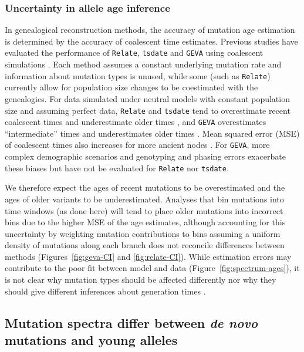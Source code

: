 \documentclass[]{article}
\newcommand{\GEVA}{\texttt{GEVA}\xspace}
\newcommand{\tsdate}{\texttt{tsdate}\xspace}
\newcommand{\relate}{\texttt{Relate}\xspace}
\begin{document}
\subsubsection*{Uncertainty in allele age inference}

In genealogical reconstruction methods, the accuracy of mutation age estimation
is determined by the accuracy of coalescent time estimates. Previous studies
have evaluated the performance of \relate, \tsdate and \GEVA using coalescent
simulations \citep{brandt2022evaluation,albers2020dating}. Each method assumes
a constant underlying mutation rate and information about mutation types is
unused, while some (such as \relate) currently allow for population size
changes to be coestimated with the genealogies. For data simulated under
neutral models with constant population size and assuming perfect data, \relate
and \tsdate tend to overestimate recent coalescent times and underestimate
older times \citep{brandt2022evaluation}, and \GEVA overestimates
``intermediate'' times and underestimates older times \citep{albers2020dating}.
Mean squared error (MSE) of coalescent times also increases for more ancient
nodes \citep{brandt2022evaluation}. For \GEVA, more complex demographic
scenarios and genotyping and phasing errors exacerbate these biases
\cite{albers2020dating} but have not be evaluated for \relate nor \tsdate.

We therefore expect the ages of recent mutations to be overestimated and the
ages of older variants to be underestimated. Analyses that bin mutations into
time windows (as done here) will tend to place older mutations into incorrect
bins due to the higher MSE of the age estimates, although accounting for this
uncertainty by weighting mutation contributions to bins assuming a uniform
density of mutations along each branch does not reconcile differences between
methods (Figures~\ref{fig:geva-CI} and \ref{fig:relate-CI}). While estimation
errors may contribute to the poor fit between model and data
(Figure~\ref{fig:spectrum-ages}), it is not clear why mutation types should be
affected differently nor why they should give different inferences about
generation times \citep{gao2023limited}.

\subsection*{Mutation spectra differ between \emph{de novo} mutations and young
alleles}
\end{document}
